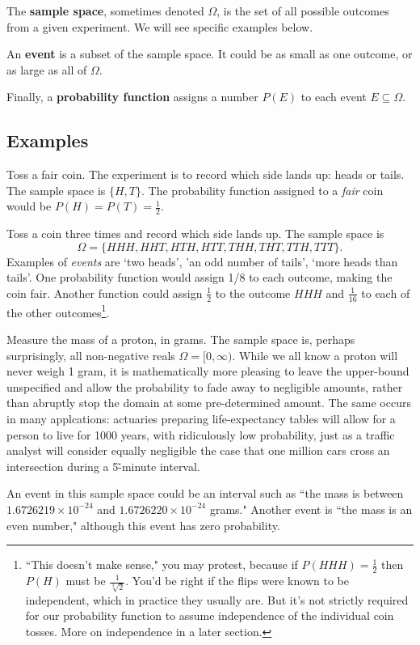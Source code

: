 \documentclass[../main.tex]{subfiles}
\begin{document}
The \textbf{sample space}, sometimes denoted $\Omega$, is the set of all possible outcomes from a given experiment. We will see specific examples below.

An \textbf{event} is a subset of the sample space. It could be as small as one outcome, or as large as all of $\Omega$.

Finally, a \textbf{probability function} assigns a number $P(E)$ to
each event $E \subseteq \Omega$.

\subsection{Examples}

\begin{example} Toss a fair coin. The experiment is to record which
	side lands up: heads or tails. The sample space is $\{H,T\}$.
	The probability function assigned to a \textit{fair} coin 
	would be $P(H)=P(T)=\frac12$.
\end{example}

\begin{example}
Toss a coin three times and record which side lands up. The sample space
is $$\Omega=\{HHH, HHT, HTH, HTT, THH, THT, TTH, TTT\}.$$ Examples of \textit{events}
are `two heads', 'an odd number of tails', `more heads than tails'. One probability
function would assign 1/8 to each outcome, making the coin fair.
Another function could assign $\frac12$ to the outcome $HHH$ and $\frac{1}{16}$ to each of the other outcomes\footnote{``This
	doesn't make sense," you may protest, because if $P(HHH)=\frac12$ then $P(H)$ must be $\frac{1}{\sqrt[3]{2}}$.
	You'd be right if the flips were known to be independent, which in practice they usually are. But
	it's not strictly required for our probability function to assume independence of the 
	individual coin tosses. More on independence in a later section.}.
\end{example}

\begin{example}
	Measure the mass of a proton, in grams. The sample space is, perhaps	surprisingly, all non-negative reals $\Omega=[0,\infty)$. While we all know a proton will never weigh
	1 gram, it is mathematically more pleasing to leave the upper-bound unspecified and allow the probability to fade away
	to negligible amounts, rather than abruptly stop the domain at
	some pre-determined amount. The same occurs in many applcations: actuaries preparing life-expectancy tables will allow for a 
	person to live for 1000 years, with ridiculously low probability,
	just as a traffic analyst will consider equally negligible the
	case that one million cars cross an intersection during a 5\~-minute
	interval.
	
	An event in this sample space could be an interval such as
	``the mass is between $1.6726219\times10^{-24}$ and
	$1.6726220\times10^{-24}$ grams." Another event is ``the
	mass is an even number," although this event has zero probability.
\end{example}
\end{document}
